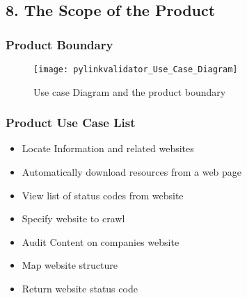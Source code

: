\documentclass[titlepage]{article}
\begin{document}
\subsection{8. The Scope of the Product}
\subsubsection*{Product Boundary}
\begin{figure}[h!]
  \caption{Use case Diagram and the product boundary}
  \centering
    \texttt{[image: pylinkvalidator\_Use\_Case\_Diagram]}
\end{figure}

\subsubsection*{Product Use Case List  }
\begin{itemize}
  \item Locate Information and related websites
  \item Automatically download resources from a web page
  \item View list of status codes from website 
  \item Specify website to crawl
  \item Audit Content on companies website 
  \item Map website structure
  \item Return website status code
\end{itemize}
\end{document}
